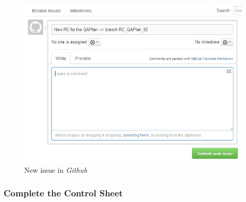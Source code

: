 \documentclass{template/openetcs_article}
\begin{document}
\begin{figure}
\centering
\includegraphics [width=\textwidth]{./figures/NewIssue.JPG}
\caption{New issue in {\it Github}}
\end{figure}

\subsubsection{Complete the Control Sheet}
\end{document}
